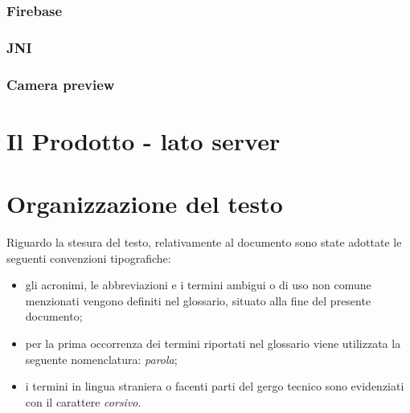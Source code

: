 \subsubsection{Firebase}
\subsubsection{JNI}
\subsubsection{Camera preview}

\section{Il Prodotto - lato server}



\section{Organizzazione del testo}
Riguardo la stesura del testo, relativamente al documento sono state adottate le seguenti convenzioni tipografiche:
\begin{itemize}
	\item gli acronimi, le abbreviazioni e i termini ambigui o di uso non comune menzionati vengono definiti nel glossario, situato alla fine del presente documento;
	\item per la prima occorrenza dei termini riportati nel glossario viene utilizzata la seguente nomenclatura: \emph{parola}\glsfirstoccur;
	\item i termini in lingua straniera o facenti parti del gergo tecnico sono evidenziati con il carattere \emph{corsivo}.
\end{itemize}